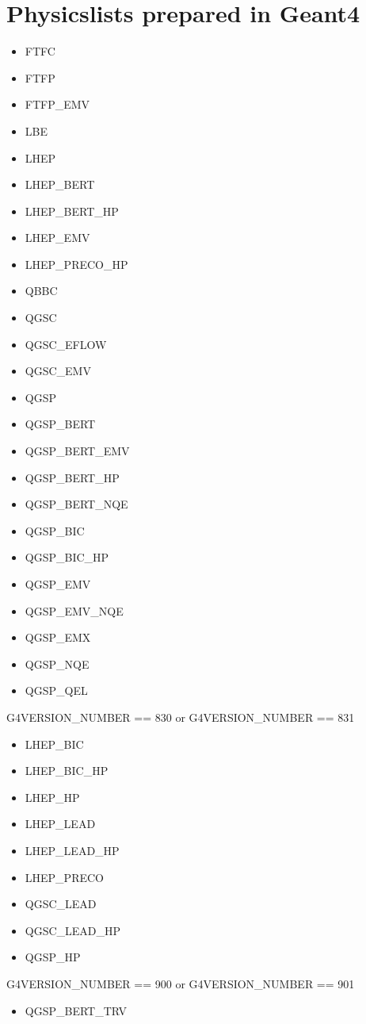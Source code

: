 \documentclass[a4paper,12pt]{article}
\begin{document}
 \section{Physicslists prepared in Geant4\label{app:pl}}
 \begin{itemize}
  \item FTFC
  \item FTFP
  \item FTFP\_EMV
  \item LBE
  \item LHEP
  \item LHEP\_BERT
  \item LHEP\_BERT\_HP
  \item LHEP\_EMV
  \item LHEP\_PRECO\_HP
  \item QBBC
  \item QGSC
  \item QGSC\_EFLOW
  \item QGSC\_EMV
  \item QGSP
  \item QGSP\_BERT
  \item QGSP\_BERT\_EMV
  \item QGSP\_BERT\_HP
  \item QGSP\_BERT\_NQE
  \item QGSP\_BIC
  \item QGSP\_BIC\_HP
  \item QGSP\_EMV
  \item QGSP\_EMV\_NQE
  \item QGSP\_EMX
  \item QGSP\_NQE
  \item QGSP\_QEL	
 \end{itemize}

  G4VERSION\_NUMBER == 830 or G4VERSION\_NUMBER == 831
  \begin{itemize}
   \item LHEP\_BIC
   \item LHEP\_BIC\_HP
   \item LHEP\_HP
   \item LHEP\_LEAD
   \item LHEP\_LEAD\_HP
   \item LHEP\_PRECO
   \item QGSC\_LEAD
   \item QGSC\_LEAD\_HP
   \item QGSP\_HP
  \end{itemize}
  
  G4VERSION\_NUMBER == 900 or G4VERSION\_NUMBER == 901
  \begin{itemize}
   \item QGSP\_BERT\_TRV
  \end{itemize}
\end{document}
